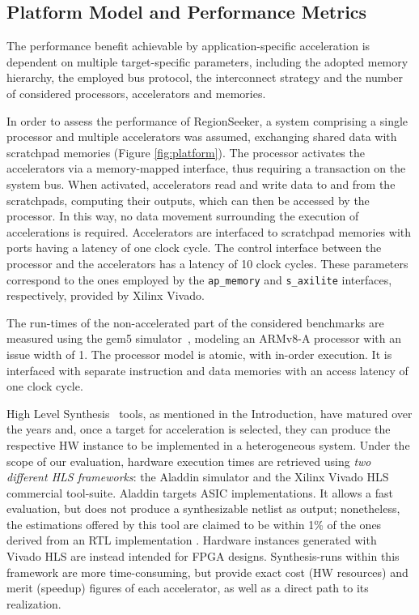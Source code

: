 \documentclass[]{usiinfthesis}
\newcommand{\rseeker}{{RegionSeeker}}
\newcommand{\HLS}{{High Level Synthesis}}
\begin{document}
\subsection{Platform Model and Performance Metrics}
\label{subsec:platform}

The performance benefit achievable by application-specific
acceleration is dependent on multiple target-specific parameters,
including the adopted memory hierarchy, the employed bus protocol, the
interconnect strategy and the number of considered processors,
accelerators and memories.\par

In order to assess the performance of \rseeker, a system comprising
a single processor and multiple accelerators was assumed, exchanging shared data 
with scratchpad memories (Figure \ref{fig:platform}). 
The processor activates the accelerators via a memory-mapped
interface, thus requiring a transaction on the system bus. 
When activated, accelerators read and
write data to and from the scratchpads, computing their outputs, which
can then be accessed by the processor. In
this way, no data movement surrounding the execution of accelerations
is required. Accelerators are interfaced to scratchpad memories
with ports having a latency of one clock cycle. The
control interface between the processor and the accelerators has a
latency of 10 clock cycles.  These parameters correspond to the ones
employed by the \texttt{ap\_memory} and \texttt{s\_axilite}
interfaces, respectively, provided by Xilinx Vivado.\par

The run-times of the non-accelerated part of the considered
benchmarks are measured using the gem5
simulator~\cite{BinkertFeb11}, modeling an ARMv8-A processor with an
issue width of 1. The processor model is atomic, with in-order
execution. It is interfaced with separate instruction and data
memories with an access latency of one clock cycle.\par

\HLS\ 
tools, as mentioned in the Introduction, have matured over the 
years and, once a target for acceleration is selected, they can produce
the respective HW instance to be implemented in a heterogeneous system.
Under the scope of our evaluation, hardware execution times are retrieved 
using \emph{two different HLS
  frameworks}: the Aladdin simulator and the Xilinx Vivado HLS
commercial tool-suite. Aladdin targets ASIC implementations. It
allows a fast evaluation, but does not produce a synthesizable netlist
as output; nonetheless, the estimations offered by this tool are claimed to be
within 1\% of the ones derived from an RTL implementation
\cite{ShaoJul14}. Hardware instances generated with Vivado HLS are
instead intended for FPGA designs. Synthesis-runs within this
framework are more time-consuming, but provide exact cost (HW resources)
and merit (speedup) figures of each accelerator, as well as a direct
path to its realization.\par
\end{document}
